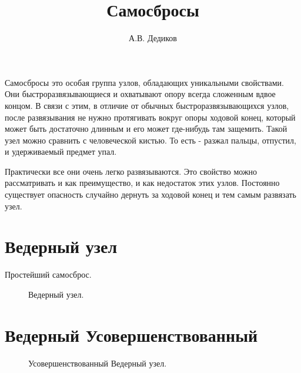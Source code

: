 \documentclass{artikel1}
\begin{document}

\title{Самосбросы}
\date{}
\author{А.В. Дедиков}

\maketitle

Самосбросы это особая группа узлов, обладающих уникальными свойствами. Они быстроразвязывающиеся и охватывают опору всегда сложенным вдвое концом. В связи с этим, в отличие от обычных быстроразвязывающихся узлов, после развязывания не нужно протягивать вокруг опоры ходовой конец, который может быть достаточно длинным и его может где-нибудь там защемить. Такой узел можно сравнить с человеческой кистью. То есть - разжал пальцы, отпустил, и удерживаемый предмет упал.

Практически все они очень легко развязываются. Это свойство можно рассматривать и как преимущество, и как недостаток этих узлов. Постоянно существует опасность случайно дернуть за ходовой конец и тем самым развязать узел.

\section{Ведерный узел}

Простейший самосброс.

\begin{figure}[H]\centering
	\subfloat[Завязывание]{\label{ris:Vederny_1_1}
	\tcbox[enhanced jigsaw,colframe=black,opacityframe=0.5,opacityback=0.5]
		{\centering
			}
		}
\hfill
	\subfloat[Результат]{\label{ris:Vederny_1_2}
	\tcbox[enhanced jigsaw,colframe=black,opacityframe=0.5,opacityback=0.5]
		{\centering
			}
		}
	\caption{Ведерный узел.}\label{ris:Vederny_1}
\end{figure}

\section{Ведерный Усовершенствованный}

\begin{figure}[H]\centering
	\subfloat[Одинарный]{\label{ris:Vederny_2_1}
	\tcbox[enhanced jigsaw,colframe=black,opacityframe=0.5,opacityback=0.5,height=7cm]
		{\centering
			}
		}
\hfill
	\subfloat[Двойной]{\label{ris:Vederny_2_2}
	\tcbox[enhanced jigsaw,colframe=black,opacityframe=0.5,opacityback=0.5,height=7cm]
		{\centering
			}
		}
\hfill
	\caption{Усовершенствованный Ведерный узел.}\label{ris:Vederny_2}
\end{figure}
\end{document}
